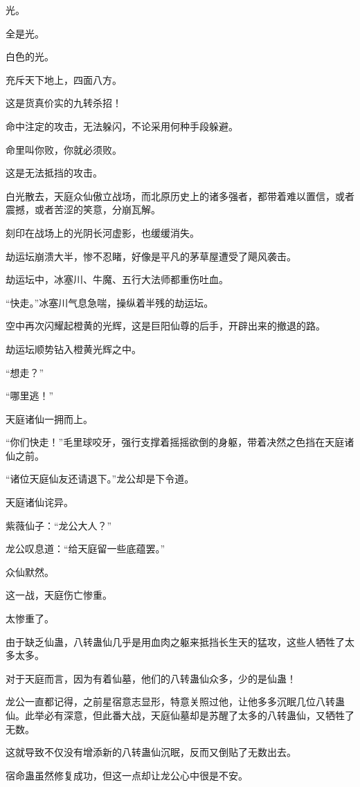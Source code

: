 \begin{this_body}
光。

全是光。

白色的光。

充斥天下地上，四面八方。

这是货真价实的九转杀招！

命中注定的攻击，无法躲闪，不论采用何种手段躲避。

命里叫你败，你就必须败。

这是无法抵挡的攻击。

白光散去，天庭众仙傲立战场，而北原历史上的诸多强者，都带着难以置信，或者震撼，或者苦涩的笑意，分崩瓦解。

刻印在战场上的光阴长河虚影，也缓缓消失。

劫运坛崩溃大半，惨不忍睹，好像是平凡的茅草屋遭受了飓风袭击。

劫运坛中，冰塞川、牛魔、五行大法师都重伤吐血。

“快走。”冰塞川气息急喘，操纵着半残的劫运坛。

空中再次闪耀起橙黄的光辉，这是巨阳仙尊的后手，开辟出来的撤退的路。

劫运坛顺势钻入橙黄光辉之中。

“想走？”

“哪里逃！”

天庭诸仙一拥而上。

“你们快走！”毛里球咬牙，强行支撑着摇摇欲倒的身躯，带着决然之色挡在天庭诸仙之前。

“诸位天庭仙友还请退下。”龙公却是下令道。

天庭诸仙诧异。

紫薇仙子：“龙公大人？”

龙公叹息道：“给天庭留一些底蕴罢。”

众仙默然。

这一战，天庭伤亡惨重。

太惨重了。

由于缺乏仙蛊，八转蛊仙几乎是用血肉之躯来抵挡长生天的猛攻，这些人牺牲了太多太多。

对于天庭而言，因为有着仙墓，他们的八转蛊仙众多，少的是仙蛊！

龙公一直都记得，之前星宿意志显形，特意关照过他，让他多多沉眠几位八转蛊仙。此举必有深意，但此番大战，天庭仙墓却是苏醒了太多的八转蛊仙，又牺牲了无数。

这就导致不仅没有增添新的八转蛊仙沉眠，反而又倒贴了无数出去。

宿命蛊虽然修复成功，但这一点却让龙公心中很是不安。


\end{this_body}
